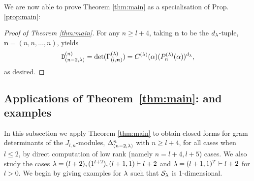 We are now able to prove Theorem \ref{thm:main} as a specialisation of Prop. \ref{prop:main}:

\begin{proof}[Proof of Theorem \ref{thm:main}] For any $n\geq l+4$, taking $\bm{n}$ to be the $d_{\lambda}$-tuple, $\bm{n}=(n,n,\dots, n)$, yields
\[{\mathtt D}^{(n)}_{(n-2,\lambda)}=\text{det}(\Gamma_{(l,\bm{n})}^{(\lambda)})=C^{(\lambda)}(\alpha) (P^{(\lambda)}_{n}(\alpha))^{d_{\lambda}},\]
as desired. \end{proof}


\subsection{Applications of Theorem~\ref{thm:main}:  and examples}   \label{ss:examples0}

In this subsection we apply Theorem \ref{thm:main} to obtain closed forms for gram determinants of the $J_{l,n}$-modules, $\Delta^{n}_{(n-2,\lambda)}$ with $n\geq l+4$, for all cases when $l\leq 2$, by direct computation of low rank (namely $n=l+4,l+5$) cases. 
We also study the cases $\lambda=(l+2), (1^{l+2}), (l+1,1)\vdash l+2$ and $\lambda=(l+1,1)^T\vdash l+2$ for $l>0$. We begin by giving examples for $\lambda$ such that $\mathcal{S}_\lambda$ is 1-dimensional.

